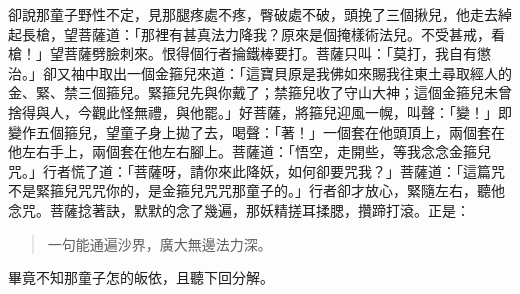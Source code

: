 卻說那童子野性不定，見那腿疼處不疼，臀破處不破，頭挽了三個揪兒，他走去綽起長槍，望菩薩道：「那裡有甚真法力降我？原來是個掩樣術法兒。不受甚戒，看槍！」望菩薩劈臉刺來。恨得個行者掄鐵棒要打。菩薩只叫：「莫打，我自有懲治。」卻又袖中取出一個金箍兒來道：「這寶貝原是我佛如來賜我往東土尋取經人的金、緊、禁三個箍兒。緊箍兒先與你戴了；禁箍兒收了守山大神；這個金箍兒未曾捨得與人，今觀此怪無禮，與他罷。」好菩薩，將箍兒迎風一幌，叫聲：「變！」即變作五個箍兒，望童子身上拋了去，喝聲：「著！」一個套在他頭頂上，兩個套在他左右手上，兩個套在他左右腳上。菩薩道：「悟空，走開些，等我念念金箍兒咒。」行者慌了道：「菩薩呀，請你來此降妖，如何卻要咒我？」菩薩道：「這篇咒不是緊箍兒咒咒你的，是金箍兒咒咒那童子的。」行者卻才放心，緊隨左右，聽他念咒。菩薩捻著訣，默默的念了幾遍，那妖精搓耳揉腮，攢蹄打滾。正是：
\begin{quote}
一句能通遍沙界，廣大無邊法力深。
\end{quote}

畢竟不知那童子怎的皈依，且聽下回分解。
